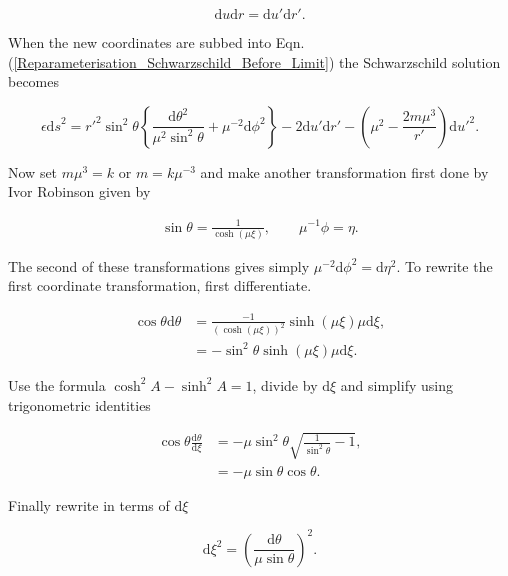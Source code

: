 \begin{equation*}
{\mathrm{d}u}{\mathrm{d}r} = {\mathrm{d}u'}{\mathrm{d}r'}. 
\end{equation*}

\noindent When the new coordinates are subbed into Eqn.(\ref{Reparameterisation_Schwarzschild_Before_Limit}) the Schwarzschild solution becomes

\begin{equation}\label{Reparameterise_Schwarzschild_Next_Before_Limit}
\epsilon {\mathrm{d}s}^2 = {r'}^2 \sin^2 \theta \left\{ \frac{{\mathrm{d}\theta}^2}{\mu^2 \sin^2 \theta} +  \mu^{-2} {\mathrm{d} \phi}^2 \right\} - 2 {\mathrm{d}u'} {\mathrm{d}r'} - \left( \mu^2 - \frac{2 m \mu^3}{r'}\right) {\mathrm{d}u'}^2 . 
\end{equation}

\noindent Now set $m \mu^{3} = k$ or $ m = k \mu^{-3}$ and make another transformation first done by Ivor Robinson given by \cite{I_Robinson_Paper}

\begin{align*} 
\sin{\theta} = \frac{1}{\cosh{(\mu \xi)}}, \qquad  \mu^{-1} \phi = \eta.  
\end{align*} 

\noindent The second of these transformations gives simply $\mu^{-2} \mathrm{d}\phi^2 = \mathrm{d} \eta^2$. To rewrite the first coordinate transformation, first differentiate.

\begin{align*} 
\cos{\theta} \mathrm{d} \theta & = \frac{-1}{(\cosh(\mu \xi))^{2}} \sinh(\mu \xi) \mu \mathrm{d} \xi, \\
                      & = -{\sin}^{2}\theta \sinh(\mu \xi) \mu \mathrm{d} \xi.
\end{align*}

\noindent Use the formula $\cosh^2 A - \sinh^2 A = 1$, divide by $\mathrm{d} \xi$ and simplify using trigonometric identities

\begin{align*}
\cos{\theta} \frac{\mathrm{d} \theta}{\mathrm{d} \xi} & = -\mu \sin^2 \theta \sqrt{\frac{1}{\sin^2 \theta} - 1}, \\
                                    & = - \mu \sin \theta \cos \theta.
\end{align*}

\noindent Finally rewrite in terms of $\mathrm{d} \xi$

\begin{equation*}
\mathrm{d} \xi^2 = {\left( \frac{\mathrm{d} \theta}{\mu \sin \theta}  \right)}^2.
\end{equation*}

